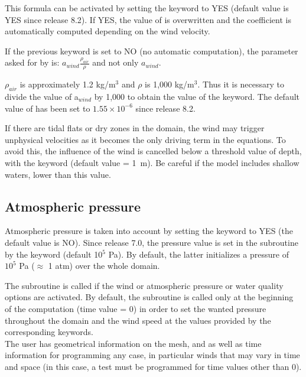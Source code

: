 This formula can be activated by setting the keyword
 to YES
(default value is YES since release 8.2).
If YES, the value of  is overwritten and
the coefficient is automatically computed depending on the wind velocity.

If the previous keyword is set to NO (no automatic computation), the parameter
 asked for by  is:
$a_{wind} \frac{\rho_{air}}{\rho}$ and not only $a_{wind}$.

$\rho_{air}$ is approximately 1.2 kg/m$^3$ and $\rho$ is 1,000 kg/m$^3$.
Thus it is necessary to divide the value of a$_{wind}$ by 1,000
to obtain the value of the  keyword.
The default value of  has been set to
$1.55 \times 10^{-6}$ since release 8.2.

If there are tidal flats or dry zones in the domain, the wind may trigger
unphysical velocities as it becomes the only driving term in the equations.
To avoid this, the influence of the wind is cancelled below a threshold value
of depth, with the keyword 
(default value = 1~m).
Be careful if the model includes shallow waters, lower than this value.

\subsection{Atmospheric pressure}

Atmospheric pressure is taken into account by setting the keyword
 to YES (the default value is NO).
Since release 7.0, the pressure value is set in the 
subroutine by the keyword 
(default 10$^5$ Pa).
By default, the latter initializes a pressure of $10^5$ Pa ($\approx$ 1 atm)
over the whole domain.

The  subroutine is called if the wind or atmospheric pressure
or water quality options are activated.
By default, the subroutine is called only at the beginning of the computation
(time value = 0) in order to set the wanted pressure throughout the domain
and the wind speed at the values provided by the corresponding keywords.\\

The user has geometrical information on the mesh, and as well as time
information for programming any case, in particular winds that may vary in time
and space (in this case, a test must be programmed for time values other than 0).

